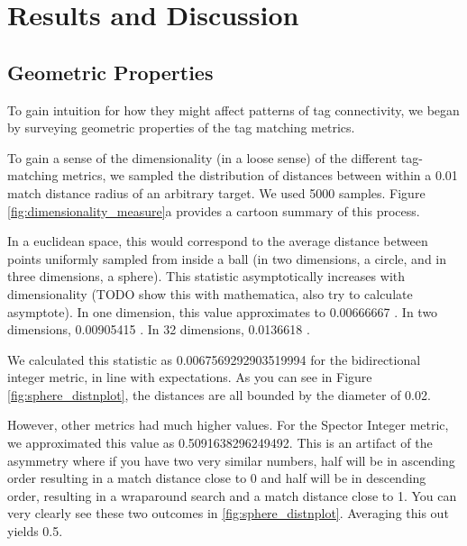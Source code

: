 \section{Results and Discussion}

\subsection{Geometric Properties}

To gain intuition for how they might affect patterns of tag connectivity, we began by surveying geometric properties of the tag matching metrics.





To gain a sense of the dimensionality (in a loose sense) of the different tag-matching metrics, we sampled the distribution of distances between within a 0.01 match distance radius of an arbitrary target.
We used 5000 samples.
Figure \ref{fig:dimensionality_measure}a provides a cartoon summary of this process.

In a euclidean space, this would correspond to the average distance between points uniformly sampled from inside a ball (in two dimensions, a circle, and in three dimensions, a sphere).
This statistic asymptotically increases with dimensionality (TODO show this with mathematica, also try to calculate asymptote).
In one dimension, this value approximates to 0.00666667 \citep{dunbar1997average}.
In two dimensions, 0.00905415 \citep{dunbar1997average}.
In 32 dimensions, 0.0136618 \citep{dunbar1997average}.

We calculated this statistic as  0.0067569292903519994 for the bidirectional integer metric, in line with expectations.
As you can see in Figure \ref{fig:sphere_distnplot}, the distances are all bounded by the diameter of 0.02.

However, other metrics had much higher values.
For the Spector Integer metric, we approximated this value as 0.5091638296249492.
This is an artifact of the asymmetry where if you have two very similar numbers, half will be in ascending order resulting in a match distance close to 0 and half will be in descending order, resulting in a wraparound search and a match distance close to 1.
You can very clearly see these two outcomes in \ref{fig:sphere_distnplot}.
Averaging this out yields 0.5.

